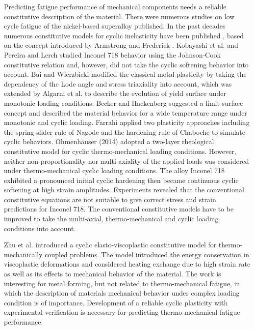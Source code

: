 Predicting fatigue performance of mechanical components needs a reliable constitutive description of the material. There were numerous studies on low cycle fatigue of the nickel-based superalloy published. In the past decades numerous constitutive models for cyclic inelasticity have been published \cite{ohno1993kinematic, Pun2014138, AbdelKarim2000225, Kang2004299}, based on the concept introduced by Armstrong and Frederick \cite{armstrong1966mathematical}. Kobayashi et al. \cite{Kobayashi2008389} and Pereira and Lerch \cite{Pereira2001715} studied Inconel 718 behavior using the Johnson-Cook constitutive relation and, however, did not take the cyclic softening behavior into account.
Bai and Wierzbicki \cite{Bai20081071} modified the classical metal plasticity by taking the dependency of the Lode angle and stress triaxiality into account, which was extended by Algarni et al.  \cite{Algarni2015140} to describe the evolution of yield surface under monotonic loading conditions. Becker and Hackenberg \cite{Becker2011596} suggested a limit surface concept and described the material behavior for a wide temperature range under monotonic and cyclic loading.
Farrahi  \cite{Farrahi2014245} applied two plasticity approaches including the spring-slider rule of Nagode and the hardening rule of Chaboche to simulate cyclic behaviors.
Ohmenh\"{a}user (2014) \cite{Ohmenhauser2014631} adopted a two-layer rheological constitutive model for cyclic thermo-mechanical loading conditions.
However, neither non-proportionality nor multi-axiality of the applied loads was considered under thermo-mechanical cyclic loading conditions.
The alloy Inconel 718 exhibited a pronounced initial cyclic hardening then became continuous cyclic softening at high strain amplitudes. Experiments revealed that the conventional constitutive equations are not suitable to give correct stress and strain predictions for Inconel 718. The conventional constitutive models have to be improved to take the multi-axial, thermo-mechanical and cyclic loading conditions into account.

Zhu et al. \cite{ZHU2016} introduced a cyclic elasto-viscoplastic constitutive model for thermo-mechanically coupled problems. The model introduced the energy conservation in viscoplastic deformations and considered heating exchange due to high strain rate as well as its effects to mechanical behavior of the material. The work is interesting for metal forming, but not related to thermo-mechanical fatigue, in which the description of materials mechanical behavior under complex loading condition is of importance. 
Development of a reliable cyclic plasticity with experimental verification is necessary for predicting thermo-mechanical fatigue performance.

